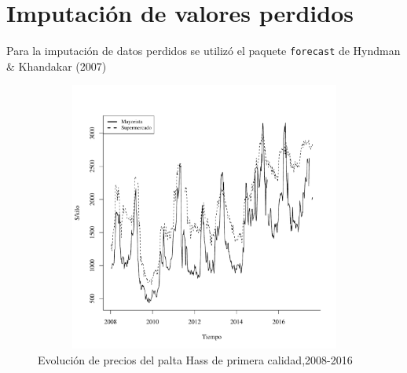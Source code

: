 \documentclass[12pt, twoside]{book}\usepackage[]{graphicx}\usepackage[]{color}
\newenvironment{knitrout}{}{} %
\numberwithin{equation}{section}
\numberwithin{theorem}{section}
\numberwithin{teorema}{section}
\numberwithin{defi}{section}
\numberwithin{prop}{section}
\numberwithin{defi}{section}
\theoremstyle{plain}
\begin{document}
\section{Imputación de valores perdidos}






Para la imputación de datos perdidos se utilizó el paquete \texttt{forecast} de Hyndman \& Khandakar (2007)





\begin{knitrout}
\color{fgcolor}\begin{figure}[H]

{\centering \includegraphics[width=6.5in,height=3.5in]{figure/fig-1-1} 

}

\caption[Evolución de precios del palta Hass de primera calidad,2008-2016]{Evolución de precios del palta Hass de primera calidad,2008-2016}\label{fig:fig-1}
\end{figure}


\end{knitrout}
\end{document}
